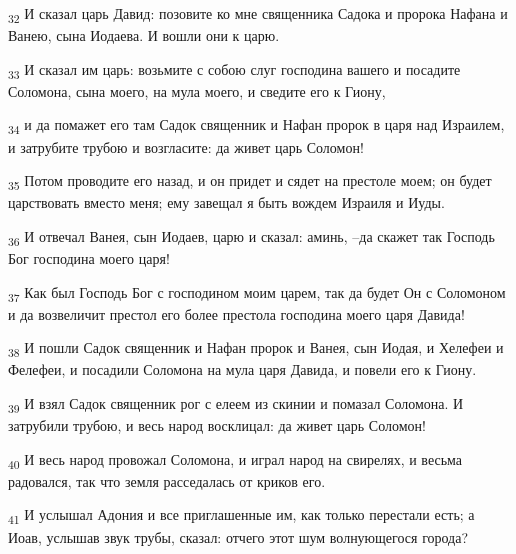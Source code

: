 \begin{tcolorbox}
\textsubscript{32} И сказал царь Давид: позовите ко мне священника Садока и пророка Нафана и Ванею, сына Иодаева. И вошли они к царю.
\end{tcolorbox}
\begin{tcolorbox}
\textsubscript{33} И сказал им царь: возьмите с собою слуг господина вашего и посадите Соломона, сына моего, на мула моего, и сведите его к Гиону,
\end{tcolorbox}
\begin{tcolorbox}
\textsubscript{34} и да помажет его там Садок священник и Нафан пророк в царя над Израилем, и затрубите трубою и возгласите: да живет царь Соломон!
\end{tcolorbox}
\begin{tcolorbox}
\textsubscript{35} Потом проводите его назад, и он придет и сядет на престоле моем; он будет царствовать вместо меня; ему завещал я быть вождем Израиля и Иуды.
\end{tcolorbox}
\begin{tcolorbox}
\textsubscript{36} И отвечал Ванея, сын Иодаев, царю и сказал: аминь, --да скажет так Господь Бог господина моего царя!
\end{tcolorbox}
\begin{tcolorbox}
\textsubscript{37} Как был Господь Бог с господином моим царем, так да будет Он с Соломоном и да возвеличит престол его более престола господина моего царя Давида!
\end{tcolorbox}
\begin{tcolorbox}
\textsubscript{38} И пошли Садок священник и Нафан пророк и Ванея, сын Иодая, и Хелефеи и Фелефеи, и посадили Соломона на мула царя Давида, и повели его к Гиону.
\end{tcolorbox}
\begin{tcolorbox}
\textsubscript{39} И взял Садок священник рог с елеем из скинии и помазал Соломона. И затрубили трубою, и весь народ восклицал: да живет царь Соломон!
\end{tcolorbox}
\begin{tcolorbox}
\textsubscript{40} И весь народ провожал Соломона, и играл народ на свирелях, и весьма радовался, так что земля расседалась от криков его.
\end{tcolorbox}
\begin{tcolorbox}
\textsubscript{41} И услышал Адония и все приглашенные им, как только перестали есть; а Иоав, услышав звук трубы, сказал: отчего этот шум волнующегося города?
\end{tcolorbox}
